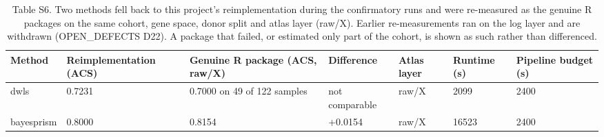 \begin{table}[htbp]
\centering
\small
\caption{Table S6. Two methods fell back to this project's reimplementation during the confirmatory runs and were re-measured as the genuine R packages on the same cohort, gene space, donor split and atlas layer (raw/X). Earlier re-measurements ran on the log layer and are withdrawn (OPEN\_DEFECTS D22). A package that failed, or estimated only part of the cohort, is shown as such rather than differenced.}
\label{tab:S6_genuine_vs_reimplementation}
\begin{tabular}{lllllll}
\toprule
\textbf{Method} & \textbf{Reimplementation (ACS)} & \textbf{Genuine R package (ACS, raw/X)} & \textbf{Difference} & \textbf{Atlas layer} & \textbf{Runtime (s)} & \textbf{Pipeline budget (s)} \\
\midrule
dwls & 0.7231 & 0.7000 on 49 of 122 samples & not comparable & raw/X & 2099 & 2400 \\
bayesprism & 0.8000 & 0.8154 & +0.0154 & raw/X & 16523 & 2400 \\
\bottomrule
\end{tabular}
\end{table}

